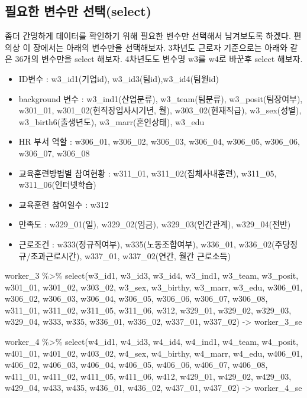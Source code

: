 \documentclass[
]{book}
\newenvironment{Shaded}{\begin{snugshade}}{\end{snugshade}}
\newcommand{\FunctionTok}[1]{\textcolor[rgb]{0.00,0.00,0.00}{#1}}
\newcommand{\NormalTok}[1]{#1}
\newcommand{\OtherTok}[1]{\textcolor[rgb]{0.56,0.35,0.01}{#1}}
\newcommand{\SpecialCharTok}[1]{\textcolor[rgb]{0.00,0.00,0.00}{#1}}
\providecommand{\tightlist}{%
  \setlength{\itemsep}{0pt}\setlength{\parskip}{0pt}}
\theoremstyle{definition}
\theoremstyle{definition}
\theoremstyle{definition}
\theoremstyle{definition}
\theoremstyle{remark}
\begin{document}
\hypertarget{uxd544uxc694uxd55c-uxbcc0uxc218uxb9cc-uxc120uxd0ddselect}{%
\subsection{필요한 변수만 선택(select)}\label{uxd544uxc694uxd55c-uxbcc0uxc218uxb9cc-uxc120uxd0ddselect}}

좀더 간명하게 데이터를 확인하기 위해 필요한 변수만 선택해서 남겨보도록 하겠다. 편의상 이 장에서는 아래의 변수만을 선택해보자. 3차년도 근로자 기준으로는 아래와 같은 36개의 변수만을 select 해보자. 4차년도도 변수명 w3를 w4로 바꾼후 select 해보자.

\begin{itemize}
\tightlist
\item
  ID변수 : w3\_id1(기업id), w3\_id3(팀id),w3\_id4(팀원id)
\item
  background 변수 : w3\_ind1(산업분류), w3\_team(팀분류), w3\_posit(팀장여부), w301\_01, w301\_02(현직장입사시기년, 월), w303\_02(현재직급), w3\_sex(성별), w3\_birth6(출생년도), w3\_marr(혼인상태), w3\_edu
\item
  HR 부서 역할 : w306\_01, w306\_02, w306\_03, w306\_04, w306\_05, w306\_06, w306\_07, w306\_08
\item
  교육훈련방법별 참여현황 : w311\_01, w311\_02(집체사내훈련), w311\_05, w311\_06(인터넷학습)
\item
  교육훈련 참여일수 : w312
\item
  만족도 : w329\_01(일), w329\_02(임금), w329\_03(인간관계), w329\_04(전반)
\item
  근로조건 : w333(정규직여부), w335(노동조합여부), w336\_01, w336\_02(주당정규/초과근로시간), w337\_01, w337\_02(연간, 월간 근로소득)
\end{itemize}

\begin{Shaded}
\begin{Highlighting}[]
\NormalTok{worker\_3 }\SpecialCharTok{\%\textgreater{}\%} 
  \FunctionTok{select}\NormalTok{(w3\_id1, w3\_id3, w3\_id4, w3\_ind1, w3\_team, w3\_posit, w301\_01, w301\_02, w303\_02, w3\_sex, w3\_birthy, w3\_marr, w3\_edu, w306\_01, w306\_02, w306\_03, w306\_04, w306\_05, w306\_06, w306\_07, w306\_08, w311\_01, w311\_02, w311\_05, w311\_06, w312, w329\_01, w329\_02, w329\_03, w329\_04, w333, w335, w336\_01, w336\_02, w337\_01, w337\_02) }\OtherTok{{-}\textgreater{}}\NormalTok{ worker\_3\_se}

\NormalTok{worker\_4 }\SpecialCharTok{\%\textgreater{}\%} 
  \FunctionTok{select}\NormalTok{(w4\_id1, w4\_id3, w4\_id4, w4\_ind1, w4\_team, w4\_posit, w401\_01, w401\_02, w403\_02, w4\_sex, w4\_birthy, w4\_marr, w4\_edu, w406\_01, w406\_02, w406\_03, w406\_04, w406\_05, w406\_06, w406\_07, w406\_08, w411\_01, w411\_02, w411\_05, w411\_06, w412, w429\_01, w429\_02, w429\_03, w429\_04, w433, w435, w436\_01, w436\_02, w437\_01, w437\_02) }\OtherTok{{-}\textgreater{}}\NormalTok{ worker\_4\_se}
\end{Highlighting}
\end{Shaded}
\end{document}
